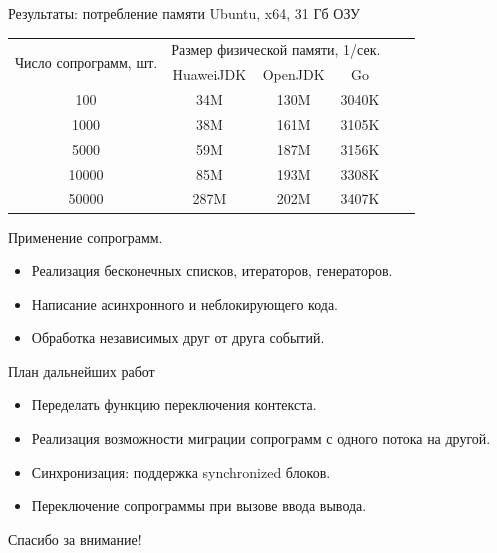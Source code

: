 \begin{frame}{Результаты: потребление памяти}
	Ubuntu, x64, 31 Гб ОЗУ
	\begin{table}[H]
		\begin{tabular}{|c|c|c|c|c|c|}
			\hline \multirow{2}{*}{Число сопрограмм, шт.} & \multicolumn{3}{|c|}{Размер физической памяти, 1/сек.}    \\
			\cline{2-4}    & HuaweiJDK & OpenJDK  & Go   \\
			\hline 100     & 34M       & 130M     & 3040K  \\
			\hline 1000    & 38M       & 161M     & 3105K  \\
			\hline 5000    & 59M       & 187M     & 3156K  \\
			\hline 10000   & 85M       & 193M     & 3308K \\
			\hline 50000   & 287M      & 202M     & 3407K  \\ 
			\hline 
		\end{tabular}
	\end{table}
\end{frame}


\begin{frame}{Применение сопрограмм.}
	\begin{itemize}
		\item Реализация бесконечных списков, итераторов, генераторов.
		\item Написание асинхронного и неблокирующего кода.
		\item Обработка независимых друг от друга событий.
	\end{itemize}
\end{frame}

\begin{frame}{План дальнейших работ} 
	\begin{itemize}
	\item Переделать функцию переключения контекста.
	\item Реализация возможности миграции сопрограмм с одного потока на другой.
	\item Синхронизация: поддержка synchronized блоков.
	\item Переключение сопрограммы при вызове ввода вывода.
	\end{itemize}
\end{frame}

\begin{frame}
	\begin{center}
		Спасибо за внимание!
	\end{center}
\end{frame}


